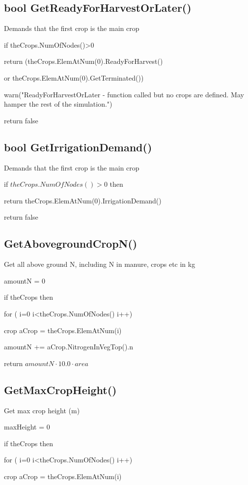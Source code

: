 \documentclass[%
]{scrartcl}
\begin{document}
{{{\subsection{bool GetReadyForHarvestOrLater()}
Demands that the first crop is the main crop

   if theCrops.NumOfNodes()>0

    \quad   return (theCrops.ElemAtNum(0).ReadyForHarvest() 

 \quad \quad or theCrops.ElemAtNum(0).GetTerminated())
  
warn("ReadyForHarvestOrLater - function called but no crops are defined. May hamper the rest of the simulation.")
  
 return false


\subsection{bool GetIrrigationDemand()}
Demands that the first crop is the main crop

   if $theCrops.NumOfNodes()>0$ then
   
   \quad   return theCrops.ElemAtNum(0).IrrigationDemand()
 
   return false


\subsection{GetAbovegroundCropN()}
Get all above ground N, including N in manure, crops etc in kg

	  amountN = 0

   if theCrops then
   
     \quad	for ( i=0 i<theCrops.NumOfNodes() i++)
      
      \quad  \quad     crop  aCrop = theCrops.ElemAtNum(i)
      
        \quad  \quad   amountN += aCrop.NitrogenInVegTop().n
      
   
   return $amountN \cdot 10.0 \cdot area$


\subsection{GetMaxCropHeight()}
	Get max crop height (m)

	  maxHeight = 0

   if theCrops then
   
   \quad  	for ( i=0 i<theCrops.NumOfNodes() i++)
   
    \quad   \quad      crop    aCrop = theCrops.ElemAtNum(i)
   
}}}
\end{document}

